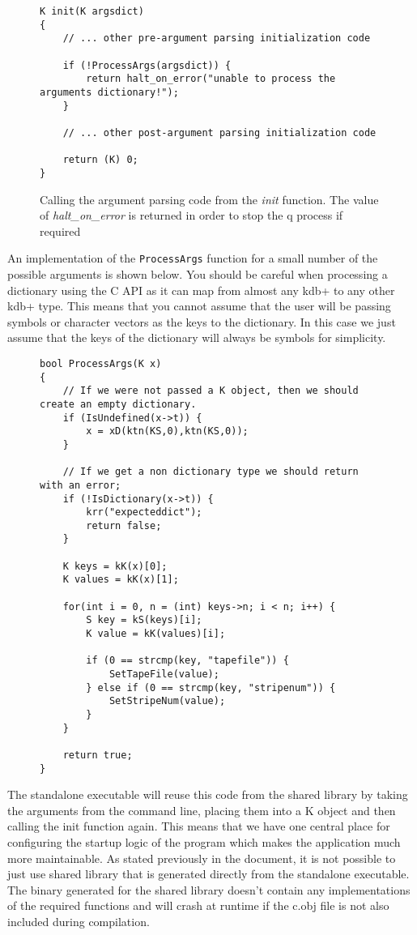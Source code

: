 \begin{figure}
\begin{lstlisting}
K init(K argsdict)
{
	// ... other pre-argument parsing initialization code
	
	if (!ProcessArgs(argsdict)) {
		return halt_on_error("unable to process the arguments dictionary!");
	}
	
	// ... other post-argument parsing initialization code
	
	return (K) 0;
}
\end{lstlisting}
\caption{Calling the argument parsing code from the \textit{init} function. The value of \textit{halt\_on\_error} is returned in order to stop the q process if required}
\end{figure}

An implementation of the \verb|ProcessArgs| function for a small number of the possible arguments is shown below. You should be careful when processing a dictionary using the C API as it can map from almost any kdb+ to any other kdb+ type. This means that you cannot assume that the user will be passing symbols or character vectors as the keys to the dictionary. In this case we just assume that the keys of the dictionary will always be symbols for simplicity.

\begin{figure}
\begin{lstlisting}
bool ProcessArgs(K x)
{
	// If we were not passed a K object, then we should create an empty dictionary.
	if (IsUndefined(x->t)) {
		x = xD(ktn(KS,0),ktn(KS,0));
	}

	// If we get a non dictionary type we should return with an error;
	if (!IsDictionary(x->t)) {
		krr("expecteddict");
		return false;
	}

	K keys = kK(x)[0];
	K values = kK(x)[1];

	for(int i = 0, n = (int) keys->n; i < n; i++) {
		S key = kS(keys)[i];
		K value = kK(values)[i];

		if (0 == strcmp(key, "tapefile")) {
			SetTapeFile(value);
		} else if (0 == strcmp(key, "stripenum")) {
			SetStripeNum(value);
		}
	}

	return true;
}
\end{lstlisting}
\caption{}
\end{figure}

The standalone executable will reuse this code from the shared library by taking the arguments from the
command line, placing them into a K object and then calling the init function again. This means that we
have one central place for configuring the startup logic of the program which makes the application much
more maintainable. As stated previously in the document, it is not possible to just use shared
library that is generated directly from the standalone executable. The binary generated for the
shared library doesn't contain any implementations of the required functions and will crash at
runtime if the c.obj file is not also included during compilation.

